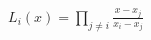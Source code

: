 \documentclass[preview]{standalone}
\begin{document}
\begin{align*}
L_i(x) = \prod_{j \neq i} \frac{x - x_j}{x_i - x_j}
\end{align*}
\end{document}
